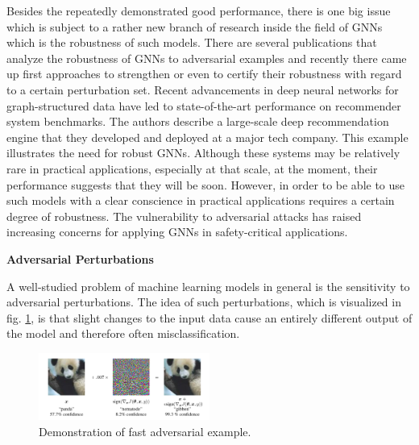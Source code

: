 \documentclass[a4paper,preprint]{sig-alternate}
\begin{document}
Besides the repeatedly demonstrated good performance, there is one big issue which is subject to a rather new branch of 
research inside the field of GNNs which is the robustness of such models. There are several publications that analyze 
the robustness of GNNs to adversarial examples and recently there came up first approaches to strengthen
or even to certify their robustness with regard to a certain perturbation set.\newline
Recent advancements in deep neural networks for graph-structured data have led to state-of-the-art performance on recommender system benchmarks.\cite{Ying_2018}
The authors describe a large-scale deep recommendation engine that they developed and deployed at a major tech company.
This example illustrates the need for robust GNNs. Although these systems may be relatively rare in practical applications, especially at
that scale, at the moment, their performance suggests that they will be soon. However, in order to be able to use such models
with a clear conscience in practical applications requires a certain degree of robustness.
The vulnerability to adversarial attacks has raised increasing concerns for applying GNNs in safety-critical applications.\cite{jin2020graph}\newline

\textbf{Adversarial Perturbations}\newline

A well-studied problem of machine learning models in general is the sensitivity to adversarial perturbations.\cite{goodfellow2015explaining}
The idea of such perturbations, which is visualized in fig. \ref{fig:adversarial_example}, is that slight changes to the input data
cause an entirely different output of the model and therefore often misclassification.

\begin{figure}[h]
    \centering
    \includegraphics[width=0.5\textwidth]{img/adversarial_example.png}
    \caption{Demonstration of fast adversarial example. \cite{goodfellow2015explaining}}
    \label{fig:adversarial_example}
\end{figure}
\end{document}
